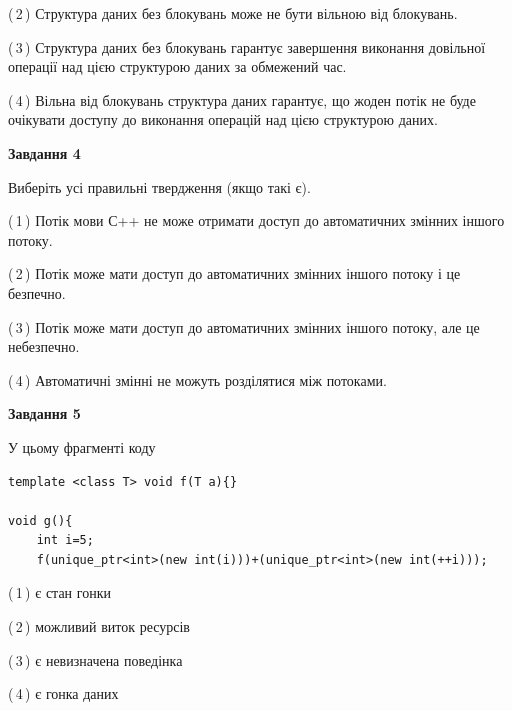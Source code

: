 \documentclass[12pt, ukrainian]{article}
\begin{document}
\begin {large}
{(\,2\,) Структура даних без блокувань може не бути вільною від блокувань.%

(\,3\,) Структура даних без блокувань гарантує завершення виконання довільної операції над цією структурою даних за обмежений час.%

(\,4\,) Вільна від блокувань структура даних гарантує, що жоден потік не буде очікувати доступу до виконання операцій над цією структурою даних.%



\begin{center}
\textbf{Завдання 4}
\end{center}
Виберіть усі правильні твердження (якщо такі є).\par
\vspace{2mm}

(\,1\,) Потік мови С++ не може отримати доступ до автоматичних змінних іншого потоку.%

(\,2\,) Потік може мати доступ до автоматичних змінних іншого потоку і це безпечно.%

(\,3\,) Потік може мати доступ до автоматичних змінних іншого потоку, але це небезпечно.%

(\,4\,) Автоматичні змінні не можуть розділятися між потоками.%



\begin{center}
\textbf{Завдання 5}
\end{center}
У цьому фрагменті коду
\begin{verbatim}
template <class T> void f(T a){}

void g(){
    int i=5;
    f(unique_ptr<int>(new int(i)))+(unique_ptr<int>(new int(++i)));
\end{verbatim}
(\,1\,) є стан гонки%

(\,2\,) можливий виток ресурсів%

(\,3\,) є невизначена поведінка%

(\,4\,) є гонка даних%


}
\end {large}
\end{document}
